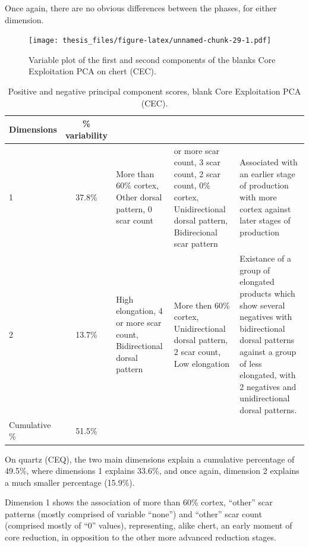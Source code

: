 \documentclass[12pt,twoside]{reedthesis}
\begin{document}
Once again, there are no obvious differences between the phases, for either dimension.
\begin{figure}
\centering
\texttt{[image: thesis\_files/figure-latex/unnamed-chunk-29-1.pdf]}
\caption{\label{fig:unnamed-chunk-29}Variable plot of the first and second components of the blanks Core Exploitation PCA on chert (CEC).}
\end{figure}
\begin{table}[!h]

\caption{\label{tab:unnamed-chunk-30}Positive and negative principal component scores, blank Core Exploitation PCA (CEC).}
\centering
\begin{tabular}[t]{lc>{\raggedright\arraybackslash}p{3cm}>{\raggedright\arraybackslash}p{3cm}>{\raggedright\arraybackslash}p{3cm}}
\toprule
\multicolumn{1}{c}{\textbf{Dimensions}} & \multicolumn{1}{c}{\textbf{\% variability}} & \multicolumn{1}{>{\centering\arraybackslash}p{3cm}}{\textbf{+}} & \multicolumn{1}{>{\centering\arraybackslash}p{3cm}}{\textbf{-}} & \multicolumn{1}{>{\centering\arraybackslash}p{3cm}}{\textbf{Interpretation}}\\
\midrule
1 & 37.8\% & More than 60\% cortex, Other dorsal pattern, 0 scar count & 4 or more scar count, 3 scar count, 2 scar count, 0\% cortex, Unidirectional dorsal pattern, Bidirecional scar pattern & Associated with an earlier stage of production with more cortex against later stages of production\\
2 & 13.7\% & High elongation, 4 or more scar count, Bidirectional dorsal pattern & More then 60\% cortex, Unidirectional dorsal pattern, 2 scar count, Low elongation & Existance of a group of elongated products which show several negatives with bidirectional dorsal patterns 
                               against a group of less elongated, with 2 negatives and unidirectional dorsal patterns.\\
Cumulative \% & 51.5\% &  &  & \\
\bottomrule
\end{tabular}
\end{table}
On quartz (CEQ), the two main dimensions explain a cumulative percentage of 49.5\%, where dimensions 1 explains 33.6\%, and once again, dimension 2 explains a much smaller percentage (15.9\%).

Dimension 1 shows the association of more than 60\% cortex, ``other'' scar patterns (mostly comprised of variable ``none'') and ``other'' scar count (comprised mostly of ``0'' values), representing, alike chert, an early moment of core reduction, in opposition to the other more advanced reduction stages.
\end{document}
